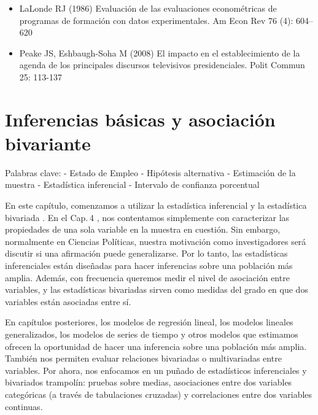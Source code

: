 \documentclass[
]{book}
\providecommand{\tightlist}{%
  \setlength{\itemsep}{0pt}\setlength{\parskip}{0pt}}
\begin{document}
\begin{itemize}
\tightlist
\item
  LaLonde RJ (1986) Evaluación de las evaluaciones econométricas de programas de formación con datos experimentales. Am Econ Rev 76 (4): 604--620
\item
  Peake JS, Eshbaugh-Soha M (2008) El impacto en el establecimiento de la agenda de los principales discursos televisivos presidenciales. Polit Commun 25: 113-137
\end{itemize}

\hypertarget{Inferenciasbuxe1sicasyasociaciuxf3nbivariante}{%
\chapter{Inferencias básicas y asociación bivariante}\label{Inferenciasbuxe1sicasyasociaciuxf3nbivariante}}

Palabras clave:
- Estado de Empleo
- Hipótesis alternativa
- Estimación de la muestra
- Estadística inferencial
- Intervalo de confianza porcentual

En este capítulo, comenzamos a utilizar la estadística inferencial y la estadística bivariada . En el Cap. 4 , nos contentamos simplemente con caracterizar las propiedades de una sola variable en la muestra en cuestión. Sin embargo, normalmente en Ciencias Políticas, nuestra motivación como investigadores será discutir si una afirmación puede generalizarse. Por lo tanto, las estadísticas inferenciales están diseñadas para hacer inferencias sobre una población más amplia. Además, con frecuencia queremos medir el nivel de asociación entre variables, y las estadísticas bivariadas sirven como medidas del grado en que dos variables están asociadas entre sí.

En capítulos posteriores, los modelos de regresión lineal, los modelos lineales generalizados, los modelos de series de tiempo y otros modelos que estimamos ofrecen la oportunidad de hacer una inferencia sobre una población más amplia. También nos permiten evaluar relaciones bivariadas o multivariadas entre variables. Por ahora, nos enfocamos en un puñado de estadísticos inferenciales y bivariados trampolín: pruebas sobre medias, asociaciones entre dos variables categóricas (a través de tabulaciones cruzadas) y correlaciones entre dos variables continuas.
\end{document}
